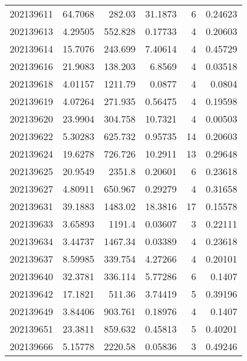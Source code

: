 \begin{tabular}{rrrrrr}
 202139611 &         64.7068  &      282.03   &           31.1873  &           6 & 0.24623 \\
 202139613 &          4.29505 &      552.828  &            0.17733 &           4 & 0.20603 \\
 202139614 &         15.7076  &      243.699  &            7.40614 &           4 & 0.45729 \\
 202139616 &         21.9083  &      138.203  &            6.8569  &           4 & 0.03518 \\
 202139618 &          4.01157 &     1211.79   &            0.0877  &           4 & 0.0804  \\
 202139619 &          4.07264 &      271.935  &            0.56475 &           4 & 0.19598 \\
 202139620 &         23.9904  &      304.758  &           10.7321  &           4 & 0.00503 \\
 202139622 &          5.30283 &      625.732  &            0.95735 &          14 & 0.20603 \\
 202139624 &         19.6278  &      726.726  &           10.2911  &          13 & 0.29648 \\
 202139625 &         20.9549  &     2351.8    &            0.20601 &           6 & 0.23618 \\
 202139627 &          4.80911 &      650.967  &            0.29279 &           4 & 0.31658 \\
 202139631 &         39.1883  &     1483.02   &           18.3816  &          17 & 0.15578 \\
 202139633 &          3.65893 &     1191.4    &            0.03607 &           3 & 0.22111 \\
 202139634 &          3.44737 &     1467.34   &            0.03389 &           4 & 0.23618 \\
 202139637 &          8.59985 &      339.754  &            4.27266 &           4 & 0.20101 \\
 202139640 &         32.3781  &      336.114  &            5.77286 &           6 & 0.1407  \\
 202139642 &         17.1821  &      511.36   &            3.74419 &           5 & 0.39196 \\
 202139649 &          3.84406 &      903.761  &            0.18976 &           4 & 0.1407  \\
 202139651 &         23.3811  &      859.632  &            0.45813 &           5 & 0.40201 \\
 202139666 &          5.15778 &     2220.58   &            0.05836 &           3 & 0.49246 \\

\end{tabular}
